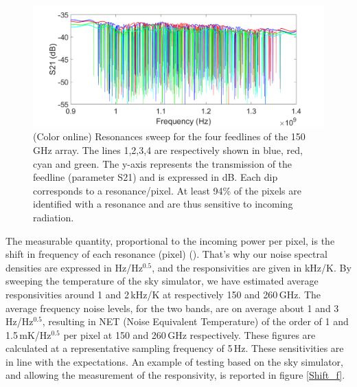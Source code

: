 \documentclass[]{aa} %
\begin{document}
\begin{figure}[h]
\begin{center}
   \centering
    \includegraphics[width=1.0\linewidth]{VNA_scans_150GHz.png}
    \caption{(Color online) Resonances sweep for the four feedlines of the 150\,GHz array. The lines 1,2,3,4 are respectively shown in blue, red, cyan and green. The y-axis represents the transmission of the feedline (parameter S21) and is expressed in dB. Each dip corresponds to a resonance/pixel. At least 94\% of the pixels are identified with a resonance and are thus sensitive to incoming radiation.}
         \label{VNA}
\end{center}
\end{figure}

The measurable quantity, proportional to the incoming power per pixel, is the shift in frequency of each resonance (pixel) (\cite{Swenson2010}). That's why our noise spectral densities are expressed in Hz/Hz$^{0.5}$, and the responsivities are given in kHz/K. By sweeping the temperature of the sky simulator, we have estimated average responsivities around 1 and 2\,kHz/K at respectively 150 and 260\,GHz. The average frequency noise levels, for the two bands, are on average about 1 and 3\,Hz/Hz$^{0.5}$, resulting in NET (Noise Equivalent Temperature) of the order of 1 and 1.5\,mK/Hz$^{0.5}$ per pixel at 150 and 260\,GHz respectively. These figures are calculated at a representative sampling frequency of 5\,Hz. 
These sensitivities are in line with the expectations. An example of testing based on the sky simulator, and allowing the measurement of the responsivity, is reported in figure \ref{Shift_f}. 
\end{document}
